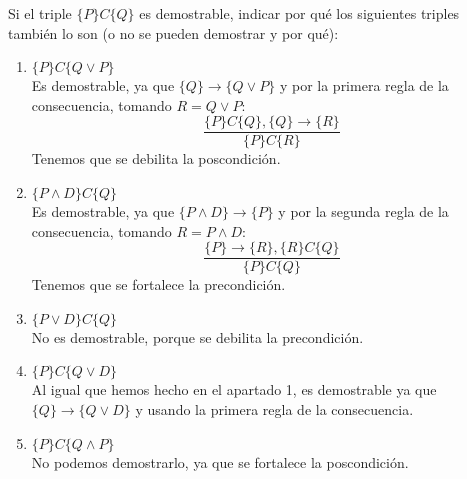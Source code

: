 \begin{ejercicio}
    Si el triple $\{P\} C \{Q\}$ es demostrable, indicar por qué los siguientes triples también lo son (o no se pueden demostrar y por qué):
    \begin{enumerate}
        \item $\{P\} C \{Q \lor P\}$\\
           Es demostrable, ya que $\{Q\}\rightarrow\{Q \lor P\}$ y por la primera regla de la consecuencia, tomando $R=Q \lor P$:
            \begin{equation*}
                \dfrac{\{P\}C\{Q\}, \{Q\}\rightarrow\{R\}}{\{P\}C\{R\}}
            \end{equation*}
            Tenemos que se debilita la poscondición.

        \item $\{P \land D\} C \{Q\}$\\
            Es demostrable, ya que $\{P \land D\}\rightarrow\{P\}$ y por la segunda regla de la consecuencia, tomando $R = P \land D$:
            \begin{equation*}
                \dfrac{\{P\}\rightarrow\{R\},\{R\}C\{Q\}}{\{P\}C\{Q\}}
            \end{equation*}
            Tenemos que se fortalece la precondición.
        \item $\{P \lor D\} C \{Q\}$\\
            No es demostrable, porque se debilita la precondición.

        \item $\{P\} C \{Q \lor D\}$\\
            Al igual que hemos hecho en el apartado 1, es demostrable ya que ${\{Q\}\rightarrow\{Q \lor D\}}$ y usando la primera regla de la consecuencia.
        \item $\{P\} C \{Q \land P\}$\\
            No podemos demostrarlo, ya que se fortalece la poscondición.
    \end{enumerate}
\end{ejercicio}


